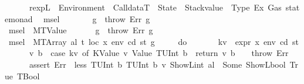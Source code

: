 \begin{isabellebody}
\ \ \ \ \ \ rexp{\isacharcolon}{\kern0pt}{\isacharcolon}{\kern0pt}{\isachardoublequoteopen}L\ {\isasymRightarrow}\ Environment\ {\isasymRightarrow}\ CalldataT\ {\isasymRightarrow}\ State\ {\isasymRightarrow}\ {\isacharparenleft}{\kern0pt}Stackvalue\ {\isacharasterisk}{\kern0pt}\ Type{\isacharcomma}{\kern0pt}\ Ex{\isacharcomma}{\kern0pt}\ Gas{\isacharparenright}{\kern0pt}\ state{\isacharunderscore}{\kern0pt}monad{\isachardoublequoteclose}\isanewline
{}\isanewline
\ \ {\isachardoublequoteopen}msel\ {\isacharunderscore}{\kern0pt}\ {\isacharunderscore}{\kern0pt}\ {\isacharunderscore}{\kern0pt}\ {\isacharbrackleft}{\kern0pt}{\isacharbrackright}{\kern0pt}\ {\isacharunderscore}{\kern0pt}\ {\isacharunderscore}{\kern0pt}\ {\isacharunderscore}{\kern0pt}\ g\ {\isacharequal}{\kern0pt}\ throw\ Err\ g{\isachardoublequoteclose}\isanewline
{\isacharbar}{\kern0pt}\ {\isachardoublequoteopen}msel\ {\isacharunderscore}{\kern0pt}\ {\isacharparenleft}{\kern0pt}MTValue\ {\isacharunderscore}{\kern0pt}{\isacharparenright}{\kern0pt}\ {\isacharunderscore}{\kern0pt}\ {\isacharunderscore}{\kern0pt}\ {\isacharunderscore}{\kern0pt}\ {\isacharunderscore}{\kern0pt}\ {\isacharunderscore}{\kern0pt}\ g\ {\isacharequal}{\kern0pt}\ throw\ Err\ g{\isachardoublequoteclose}\isanewline
{\isacharbar}{\kern0pt}\ {\isachardoublequoteopen}msel\ {\isacharunderscore}{\kern0pt}\ {\isacharparenleft}{\kern0pt}MTArray\ al\ t{\isacharparenright}{\kern0pt}\ loc\ {\isacharbrackleft}{\kern0pt}x{\isacharbrackright}{\kern0pt}\ env\ cd\ st\ g\ {\isacharequal}{\kern0pt}\isanewline
\ \ \ \ {\isacharparenleft}{\kern0pt}do\ {\isacharbraceleft}{\kern0pt}\isanewline
\ \ \ \ \ \ kv\ {\isasymleftarrow}\ expr\ x\ env\ cd\ st{\isacharsemicolon}{\kern0pt}\isanewline
\ \ \ \ \ \ {\isacharparenleft}{\kern0pt}v{\isacharcomma}{\kern0pt}\ b{\isacharparenright}{\kern0pt}\ {\isasymleftarrow}\ case\ kv\ of\ {\isacharparenleft}{\kern0pt}KValue\ v{\isacharcomma}{\kern0pt}\ Value\ {\isacharparenleft}{\kern0pt}TUInt\ b{\isacharparenright}{\kern0pt}{\isacharparenright}{\kern0pt}\ {\isasymRightarrow}\ return\ {\isacharparenleft}{\kern0pt}v{\isacharcomma}{\kern0pt}\ b{\isacharparenright}{\kern0pt}\ {\isacharbar}{\kern0pt}\ {\isacharunderscore}{\kern0pt}\ {\isasymRightarrow}\ throw\ Err{\isacharsemicolon}{\kern0pt}\isanewline
\ \ \ \ \ \ assert\ Err\ {\isacharparenleft}{\kern0pt}{\isasymlambda}{\isacharunderscore}{\kern0pt}{\isachardot}{\kern0pt}\ less\ {\isacharparenleft}{\kern0pt}TUInt\ b{\isacharparenright}{\kern0pt}\ {\isacharparenleft}{\kern0pt}TUInt\ b{}{}{}{\isacharparenright}{\kern0pt}\ v\ {\isacharparenleft}{\kern0pt}ShowL\isactrlsub i\isactrlsub n\isactrlsub t\ al{\isacharparenright}{\kern0pt}\ {\isacharequal}{\kern0pt}\ Some\ {\isacharparenleft}{\kern0pt}ShowL\isactrlsub b\isactrlsub o\isactrlsub o\isactrlsub l\ True{\isacharcomma}{\kern0pt}\ TBool{\isacharparenright}{\kern0pt}{\isacharparenright}{\kern0pt}{\isacharsemicolon}{\kern0pt}\isanewline

\end{isabellebody}
